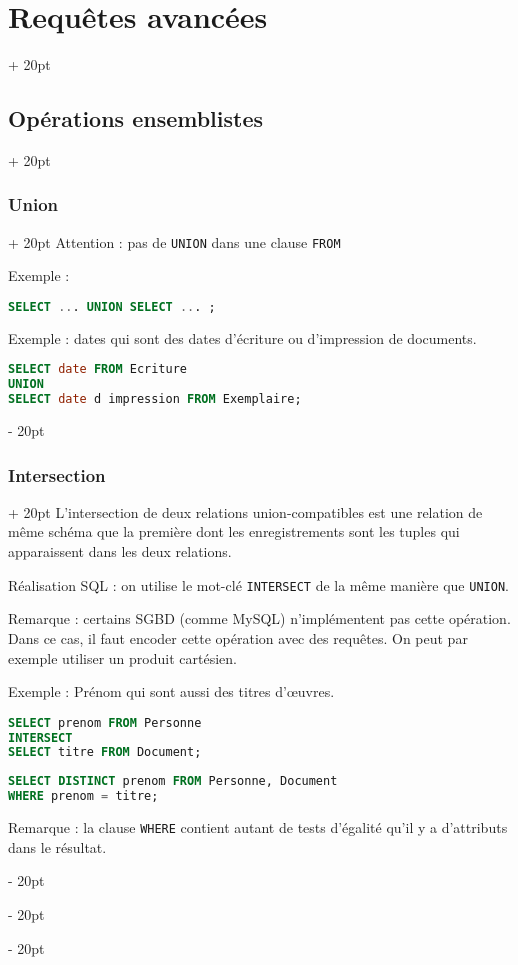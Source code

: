 \documentclass[a4paper, 12pt, twoside]{article}
\newcommand{\ind}[1][20pt]{\advance\leftskip + #1}
\newcommand{\deind}[1][20pt]{\advance\leftskip - #1}
\newenvironment{indt}[2][20pt]{#2 \par \ind[#1]}{\par \deind} %
\begin{document}
\begin{indt}{\section{Requêtes avancées}}
\begin{indt}{\subsection{Opérations ensemblistes}}
\begin{indt}{\subsubsection{Union}}
                Attention : pas de \texttt{UNION} dans une clause \texttt{FROM}

                Exemple : 
                
                \begin{lstlisting}[language=SQL, xleftmargin=80pt]
SELECT ... UNION SELECT ... ;\end{lstlisting}

                Exemple : dates qui sont des dates d'écriture ou d'impression de documents.

                \begin{lstlisting}[language=SQL, xleftmargin=80pt]
SELECT date FROM Ecriture
UNION
SELECT date d impression FROM Exemplaire;\end{lstlisting}
            \end{indt}

            \vspace{12pt}
            
            \begin{indt}{\subsubsection{Intersection}}
                L'intersection de deux relations union-compatibles est une relation de même schéma que la première dont les enregistrements sont les tuples qui apparaissent dans les deux relations.

                Réalisation SQL : on utilise le mot-clé \texttt{INTERSECT} de la même manière que \texttt{UNION}.

                Remarque : certains SGBD (comme MySQL) n'implémentent pas cette opération. Dans ce cas, il faut encoder cette opération avec des requêtes. On peut par exemple utiliser un produit cartésien.

                Exemple : Prénom qui sont aussi des titres d'\oe uvres.
                \begin{lstlisting}[language=SQL, xleftmargin=80pt]
SELECT prenom FROM Personne
INTERSECT
SELECT titre FROM Document;\end{lstlisting}

                \begin{lstlisting}[language=SQL, xleftmargin=80pt]
SELECT DISTINCT prenom FROM Personne, Document
WHERE prenom = titre;\end{lstlisting}

                Remarque : la clause \texttt{WHERE} contient autant de tests d'égalité qu'il y a d'attributs dans le résultat.
            \end{indt}


\end{indt}
\end{indt}
\end{document}

